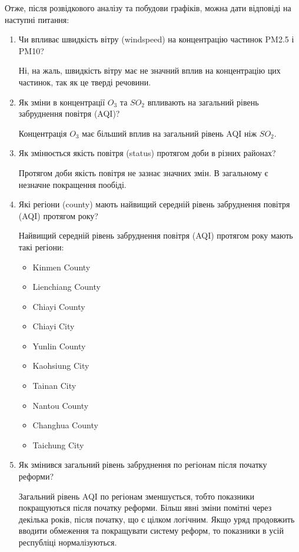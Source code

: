 \documentclass{article}
\begin{document}
Отже, після розвідкового аналізу та побудови графіків, можна дати відповіді на наступні питання:
\begin{enumerate}
    \item Чи впливає швидкість вітру (windspeed) на концентрацію частинок PM2.5 і PM10?
    
    Ні, на жаль, швидкість вітру має не значний вплив на концентрацію цих частинок, так як це тверді речовини. 
    
    \item Як зміни в концентрації  $O_3$  та $SO_2$ впливають на загальний рівень забруднення повітря (AQI)?
    
    Концентрація $O_3$ має більший вплив на загальний рівень AQI ніж $SO_2$.

    \item Як змінюється якість повітря (status) протягом доби в різних районах?
    
    Протягом доби якість повітря не зазнає значних змін. В загальному є незначне покращення пообіді. 

    \item Які регіони (county) мають найвищий середній рівень забруднення повітря (AQI) протягом року?
     
    Найвищий середній рівень забруднення повітря (AQI) протягом року мають такі регіони: 
    \begin{itemize}
        \item Kinmen County	 
        \item Lienchiang County
        \item Chiayi County	 
        \item Chiayi City	     
        \item Yunlin County	 
        \item Kaohsiung City	 
        \item Tainan City	     
        \item Nantou County	 
        \item Changhua County	 
        \item Taichung City	 
    \end{itemize} 

    \item Як змінився загальний рівень забруднення по регіонам після початку реформи?
    
    Загальний рівень AQI по регіонам зменшується, тобто показники покращуються після початку реформи.
    Більш явні зміни помітні через декілька років, після початку, що є цілком логічним. 
    Якщо уряд продовжить вводити обмеження та покращувати систему реформ, то показники в усій республіці нормалізуються. 


\end{enumerate}
\end{document}
